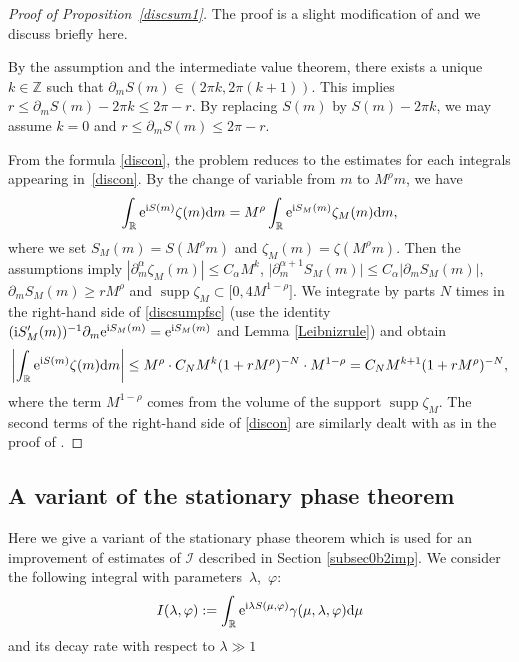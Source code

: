 \documentclass[10pt,a4paper]{amsart}
\numberwithin{equation}{section}
\def\R{\mathbb{R}}%
\DeclareMathOperator{\supp}{supp}%
\def\a{\alpha}
\def\c{\gamma}
\def\f{\varphi}
\def\l{\lambda}
\def\m{\mu}
\def\z{\zeta}
\def\pa{\partial}
\newcommand{\sI}{\mathscr{I}}
\begin{document}
\begin{proof}[Proof of Proposition~\ref{discsum1}]
The proof is a slight modification of \cite[Lemma 5.3]{IJ} and we discuss briefly here.

By the assumption and the intermediate value theorem, there exists a unique $k\in\mathbb{Z}$ such that $\pa_mS(m)\in (2\pi k,2\pi (k+1))$. This implies
$r\leq \pa_mS(m)-2\pi k\leq 2\pi -r$. By replacing $S(m)$ by $S(m)-2\pi k$, we may assume $k=0$ and $r\leq \pa_mS(m)\leq 2\pi -r$.

From the formula \eqref{discon}, the problem reduces to the estimates for each integrals appearing in~\eqref{discon}. By the change of variable from $m$ to $M^{\rho}m$, we have
\begin{align}\label{discsumpfsc}
\int_{\R}{\rm e}^{{\rm i}S(m)}\z(m){\rm d}m=M^{\rho}\int_{\R}{\rm e}^{{\rm i}S_M(m)}\z_M(m){\rm d}m,
\end{align}
where we set $S_M(m)\!=S(M^{\rho}m)$ and $\z_M(m)\!=\z(M^{\rho}m)$. Then the assumptions imply $|\pa_m^{\a}\z_M(m)|\allowbreak\leq C_{\a}M^k$, $\big|\pa_m^{\a+1}S_M(m)\big|\leq C_{\a}|\pa_mS_M(m)|$, $\pa_mS_M(m)\geq rM^{\rho}$ and $\supp \z_M\subset \bigl[0,4M^{1-\rho}\bigr]$. We integrate by parts $N$ times in the right-hand side of \eqref{discsumpfsc} (use the identity $({\rm i}S_M'(m))^{-1} \pa_m{\rm e}^{{\rm i}S_M(m)}={\rm e}^{{\rm i}S_M(m)} $ and Lemma \ref{Leibnizrule}) and obtain
\begin{align*}
\left|\int_{\R}{\rm e}^{{\rm i}S(m)}\z(m){\rm d}m\right|\leq M^{\rho}\cdot C_{N}M^k(1+rM^{\rho})^{-N}\cdot M^{1-\rho}=C_NM^{k+1}(1+rM^{\rho})^{-N},
\end{align*}
where the term $M^{1-\rho}$ comes from the volume of the support $\supp \z_M$. The second terms of the right-hand side of \eqref{discon} are similarly dealt with as in the proof of \cite[Lemma 5.3]{IJ}.
\end{proof}

\subsection{A variant of the stationary phase theorem}\label{subsecStphase}

Here we give a variant of the stationary phase theorem which is used for an improvement of estimates of $\sI$ described in Section \ref{subsec0b2imp}.
We consider the following integral with parameters~$\l$,~$\f$:
\begin{align*}
I(\l,\f):=\int_{\R}{\rm e}^{{\rm i}\l S(\m,\f)}\c(\m,\l,\f){\rm d}\m
\end{align*}
and its decay rate with respect to $\l\gg 1$
\end{document}
